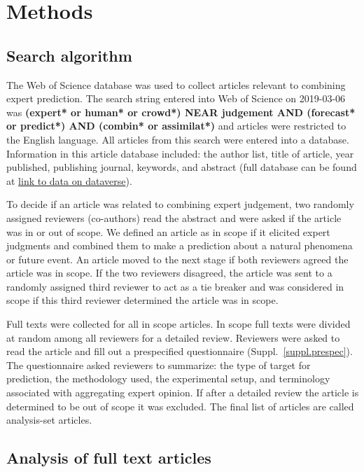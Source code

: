 \documentclass[preprint]{elsarticle}
\begin{document}
\section{Methods}
\label{sec.methods}

\subsection{Search algorithm}

The Web of Science database was used to collect articles relevant to combining expert prediction.
The search string entered into Web of Science on 2019-03-06 was \textbf{(expert* or human* or crowd*) NEAR judgement AND (forecast* or predict*) AND (combin* or assimilat*)} and articles were restricted to the English language.
All articles from this search were entered into a database.
Information in this article database included: the author list, title of article, year published, publishing journal, keywords, and abstract (full database can be found at \url{link to data on dataverse}).

To decide if an article was related to combining expert judgement, two randomly assigned reviewers (co-authors) read the abstract and were asked if the article was in or out of scope.
We defined an article as in scope if it elicited expert judgments and combined them to make a prediction about a natural phenomena or future event.
An article moved to the next stage if both reviewers agreed the article was in scope.
If the two reviewers disagreed, the article was sent to a randomly assigned third reviewer to act as a tie breaker and was considered in scope if this third reviewer determined the article was in scope.

Full texts were collected for all in scope articles.
In scope full texts were divided at random among all reviewers for a detailed review.
Reviewers were asked to read the article and fill out a prespecified questionnaire (Suppl.~\ref{suppl.prespec}).
The questionnaire asked reviewers to summarize: the type of target for prediction, the methodology used, the experimental setup, and terminology associated with aggregating expert opinion.
If after a detailed review the article is determined to be out of scope it was excluded.
The final list of articles are called analysis-set articles.

\subsection{Analysis of full text articles}
\end{document}
